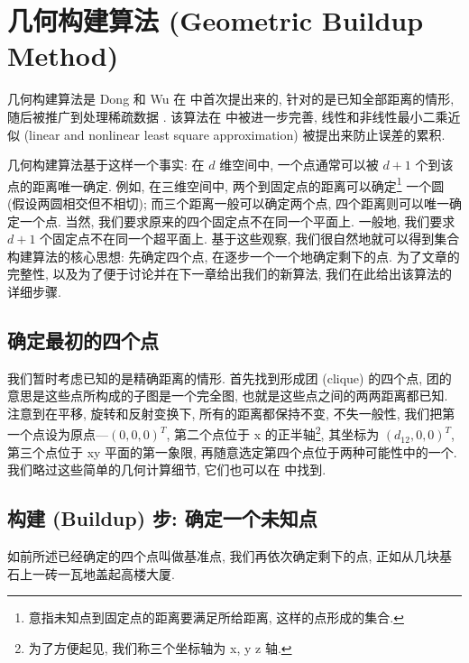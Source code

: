 \section{几何构建算法 (Geometric Buildup Method)}
\label{sec:GB}

几何构建算法是 Dong 和 Wu 在 \cite{Dong2002} 中首次提出来的, 
针对的是已知全部距离的情形, 
随后被推广到处理稀疏数据 \cite{Wu2006}. 
该算法在 \cite{Wu2008,Sit2009} 中被进一步完善, 
线性和非线性最小二乘近似 (linear and nonlinear least square approximation)
被提出来防止误差的累积.

几何构建算法基于这样一个事实: 在 $d$ 维空间中,
一个点通常可以被 $d+1$ 个到该点的距离唯一确定.
例如, 在三维空间中, 两个到固定点的距离可以确定\footnote{意指未知点到固定点的距离要满足所给距离, 这样的点形成的集合.}
一个圆 (假设两圆相交但不相切); 
而三个距离一般可以确定两个点, 四个距离则可以唯一确定一个点.
当然, 我们要求原来的四个固定点不在同一个平面上.
一般地, 我们要求 $d+1$ 个固定点不在同一个超平面上.
基于这些观察, 我们很自然地就可以得到集合构建算法的核心思想:
先确定四个点, 在逐步一个一个地确定剩下的点.
为了文章的完整性, 以及为了便于讨论并在下一章给出我们的新算法,
我们在此给出该算法的详细步骤.

\subsection{确定最初的四个点}
我们暂时考虑已知的是精确距离的情形.
首先找到形成团 (clique) 的四个点, 团的意思是这些点所构成的子图是一个完全图,
也就是这些点之间的两两距离都已知.
注意到在平移, 旋转和反射变换下, 所有的距离都保持不变,
不失一般性, 我们把第一个点设为原点---$(0,0,0)^T$, 
第二个点位于 x 的正半轴\footnote{为了方便起见, 我们称三个坐标轴为 x, y z 轴.},
其坐标为 $(d_{12},0,0)^T$,
第三个点位于 xy 平面的第一象限,
再随意选定第四个点位于两种可能性中的一个. 
我们略过这些简单的几何计算细节, 它们也可以在 \cite{Dong2002} 中找到.

\subsection{构建 (Buildup) 步: 确定一个未知点}
如前所述已经确定的四个点叫做基准点, 
我们再依次确定剩下的点, 正如从几块基石上一砖一瓦地盖起高楼大厦.

